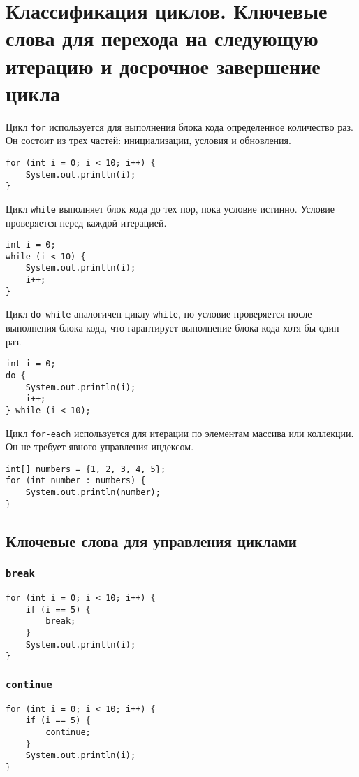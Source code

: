 \documentclass[12pt, a4paper]{article}
\begin{document}
\section{Классификация циклов. Ключевые слова для перехода на следующую итерацию и досрочное завершение цикла}
Цикл \texttt{for} используется для выполнения блока кода определенное количество раз. Он состоит из трех частей: инициализации, условия и обновления.
\begin{verbatim}
for (int i = 0; i < 10; i++) {
    System.out.println(i);
}
\end{verbatim}

Цикл \texttt{while} выполняет блок кода до тех пор, пока условие истинно. Условие проверяется перед каждой итерацией.
\begin{verbatim}
int i = 0;
while (i < 10) {
    System.out.println(i);
    i++;
}
\end{verbatim}

Цикл \texttt{do-while} аналогичен циклу \texttt{while}, но условие проверяется после выполнения блока кода, что гарантирует выполнение блока кода хотя бы один раз.

\begin{verbatim}
int i = 0;
do {
    System.out.println(i);
    i++;
} while (i < 10);
\end{verbatim}

Цикл \texttt{for-each} используется для итерации по элементам массива или коллекции. Он не требует явного управления индексом.
\begin{verbatim}
int[] numbers = {1, 2, 3, 4, 5};
for (int number : numbers) {
    System.out.println(number);
}
\end{verbatim}

\subsection*{Ключевые слова для управления циклами}

\subsubsection*{\texttt{break}}
\begin{verbatim}
for (int i = 0; i < 10; i++) {
    if (i == 5) {
        break;
    }
    System.out.println(i);
}
\end{verbatim}

\subsubsection*{\texttt{continue}}
\begin{verbatim}
for (int i = 0; i < 10; i++) {
    if (i == 5) {
        continue;
    }
    System.out.println(i);
}
\end{verbatim}
\end{document}
